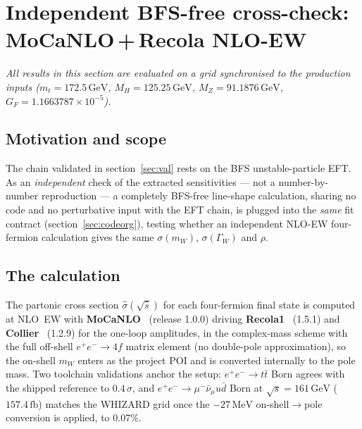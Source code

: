 \documentclass[11pt,a4paper]{article}
\newcommand{\code}[1]{\texttt{\detokenize{#1}}}
\newcommand{\mW}{m_W}
\newcommand{\GammaW}{\Gamma_W}
\newcommand{\fb}{\ensuremath{\,\mathrm{fb}}}
\newcommand{\GeV}{\ensuremath{\,\mathrm{GeV}}}
\newcommand{\MeV}{\ensuremath{\,\mathrm{MeV}}}
\begin{document}
\section{Independent BFS-free cross-check: MoCaNLO\,+\,Recola NLO-EW}\label{sec:indep}

\emph{All results in this section are evaluated on a grid synchronised to the
production inputs ($m_t=172.5\GeV$, $M_H=125.25\GeV$, $M_Z=91.1876\GeV$,
$G_F=1.1663787\times10^{-5}$).}

\subsection{Motivation and scope}\label{sec:indep-scope}

The chain validated in section~\ref{sec:val} rests on the BFS
unstable-particle EFT. As an \emph{independent} check of the extracted
sensitivities --- not a number-by-number reproduction --- a completely BFS-free
line-shape calculation, sharing no code and no perturbative input with the EFT
chain, is plugged into the \emph{same} \code{WWGenerator} fit contract
(section~\ref{sec:codeorg}), testing whether an independent NLO-EW four-fermion
calculation gives the same $\sigma(\mW)$, $\sigma(\GammaW)$ and $\rho$.

\subsection{The calculation}\label{sec:indep-calc}

The partonic cross section $\hat\sigma(\sqrt{\hat s})$ for each four-fermion
final state is computed at NLO~EW with \textbf{MoCaNLO}~\cite{MoCaNLO} (release
1.0.0) driving \textbf{Recola1}~\cite{Recola1} (1.5.1) and
\textbf{Collier}~\cite{Collier} (1.2.9) for the one-loop amplitudes, in the
complex-mass scheme with the full off-shell $e^+e^-\!\to 4f$ matrix element (no
double-pole approximation), so the on-shell $\mW$ enters as the project POI and
is converted internally to the pole mass. Two toolchain validations anchor the
setup: $e^+e^-\!\to t\bar t$ Born agrees with the shipped reference to
$0.4\,\sigma$, and $e^+e^-\!\to\mu^-\bar\nu_\mu u\bar d$ Born at $\sqrt s=161\GeV$
($157.4\fb$) matches the WHIZARD grid once the $-27\MeV$ on-shell$\to$pole
conversion is applied, to $0.07\%$.
\end{document}
